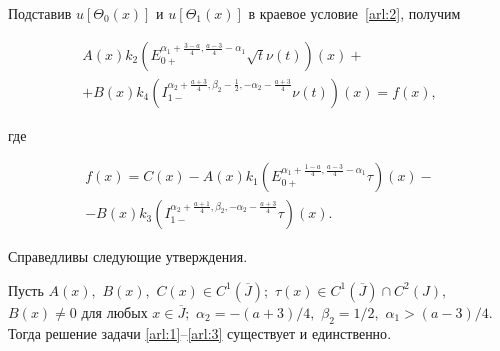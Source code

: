 Подставив $u[\Theta_0(x)]$ и $u[\Theta_1(x)]$ в краевое условие~\eqref{arl:2}, получим

\begin{multline}

A(x)k_2\left(E^{\alpha_1+\frac{3-a}{4},\frac{a-3}{4}-\alpha_1}_{0+}\sqrt{t}\nu(t)\right)(x)+

\\

+B(x)k_4\left(I^{\alpha_2+\frac{a+3}{4},\beta_2-\frac 12,-\alpha_2-\frac{a+3}{4}}_{1-}\nu(t)\right)(x)=f(x),

\label{arl:4}

\end{multline}

где 

\begin{multline*}

f(x)=C(x)-A(x)k_1\left(E^{\alpha_1+\frac{1-a}{4},\frac{a-3}{4}-\alpha_1}_{0+}\tau\right)(x)-

\\

-B(x)k_3\left(I^{\alpha_2+\frac{a+1}{4},\beta_2,-\alpha_2-\frac{a+3}{4}}_{1-}\tau\right)(x).

\end{multline*}






Справедливы следующие утверждения.



\smallskip



\begin{theorem}[1]Пусть $A(x),$ $B(x),$ $C(x)\in C^1(\overline{J});$ $\tau(x)\in C^1(\overline{J})\cap C^2(J),$ ${B(x)\neq 0}$ для любых $x\in \overline{J};$ $\alpha_2=-({a+3})/{4},$ $\beta_2=1/2,$ $\alpha_1>({a-3})/{4}.$ Тогда решение задачи \eqref{arl:1}--\eqref{arl:3} существует и единственно$.$


\end{theorem}



\smallskip



